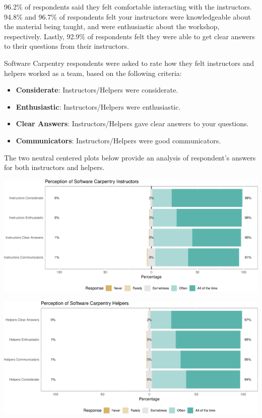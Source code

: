 \documentclass[]{article}
\makeatletter
\def\maxwidth{\ifdim\Gin@nat@width>\linewidth\linewidth\else\Gin@nat@width\fi}
\providecommand{\tightlist}{%
  \setlength{\itemsep}{0pt}\setlength{\parskip}{0pt}}
\makeatother
\begin{document}
96.2\% of respondents said they felt comfortable interacting with the
instructors. 94.8\% and 96.7\% of respondents felt your instructors were
knowledgeable about the material being taught, and were enthusiastic
about the workshop, respectively. Lastly, 92.9\% of respondents felt
they were able to get clear answers to their questions from their
instructors.

Software Carpentry respondents were asked to rate how they felt
instructors and helpers worked as a team, based on the following
criteria:

\begin{itemize}
\tightlist
\item
  \textbf{Considerate}: Instructors/Helpers were considerate.
\item
  \textbf{Enthusiastic}: Instructors/Helpers were enthusiastic.
\item
  \textbf{Clear Answers}: Instructors/Helpers gave clear answers to your
  questions.
\item
  \textbf{Communicators}: Instructors/Helpers were good communicators.
\end{itemize}

The two neutral centered plots below provide an analysis of respondent's
answers for both instructors and helpers.

\includegraphics[width=\maxwidth]{../figures/swc-perception-instructors-1}

\includegraphics[width=\maxwidth]{../figures/swc-perception-helpers-1}
\end{document}
